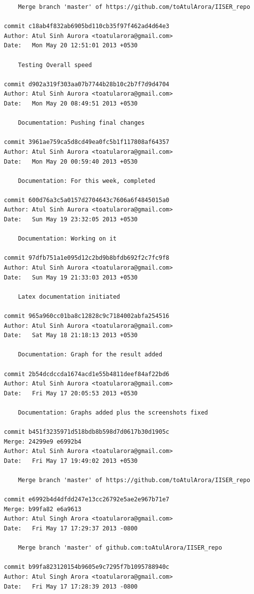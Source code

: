 \begin{lstlisting}
    Merge branch 'master' of https://github.com/toAtulArora/IISER_repo

commit c18ab4f832ab6905bd110cb35f97f462ad4d64e3
Author: Atul Sinh Aurora <toatularora@gmail.com>
Date:   Mon May 20 12:51:01 2013 +0530

    Testing Overall speed

commit d902a319f303aa07b7744b28b10c2b7f7d9d4704
Author: Atul Sinh Aurora <toatularora@gmail.com>
Date:   Mon May 20 08:49:51 2013 +0530

    Documentation: Pushing final changes

commit 3961ae759ca5d8cd49ea0fc5b1f117808af64357
Author: Atul Sinh Aurora <toatularora@gmail.com>
Date:   Mon May 20 00:59:40 2013 +0530

    Documentation: For this week, completed

commit 600d76a3c5a0157d2704643c7606a6f4845015a0
Author: Atul Sinh Aurora <toatularora@gmail.com>
Date:   Sun May 19 23:32:05 2013 +0530

    Documentation: Working on it

commit 97dfb751a1e095d12c2bd9b8bfdb692f2c7fc9f8
Author: Atul Sinh Aurora <toatularora@gmail.com>
Date:   Sun May 19 21:33:03 2013 +0530

    Latex documentation initiated

commit 965a960cc01ba8c12828c9c7184002abfa254516
Author: Atul Sinh Aurora <toatularora@gmail.com>
Date:   Sat May 18 21:18:13 2013 +0530

    Documentation: Graph for the result added

commit 2b54dcdccda1674acd1e55b4811deef84af22bd6
Author: Atul Sinh Aurora <toatularora@gmail.com>
Date:   Fri May 17 20:05:53 2013 +0530

    Documentation: Graphs added plus the screenshots fixed

commit b451f3235971d518bdb8b598d7d0617b30d1905c
Merge: 24299e9 e6992b4
Author: Atul Sinh Aurora <toatularora@gmail.com>
Date:   Fri May 17 19:49:02 2013 +0530

    Merge branch 'master' of https://github.com/toAtulArora/IISER_repo

commit e6992b4d4dfdd247e13cc26792e5ae2e967b71e7
Merge: b99fa82 e6a9613
Author: Atul Singh Arora <toatularora@gmail.com>
Date:   Fri May 17 17:29:37 2013 -0800

    Merge branch 'master' of github.com:toAtulArora/IISER_repo

commit b99fa823120154b9605e9c7295f7b1095788940c
Author: Atul Singh Arora <toatularora@gmail.com>
Date:   Fri May 17 17:28:39 2013 -0800


\end{lstlisting}
